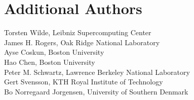 \section {Additional Authors}
Torsten Wilde, Leibniz Supercomputing Center\\
James H. Rogers, Oak Ridge National Laboratory\\
Ayse Coskun, Boston University\\
Hao Chen, Boston University\\
Peter M. Schwartz, Lawrence Berkeley National Laboratory\\
Gert Svensson, KTH Royal Institute of Technology\\
Bo Norregaard Jorgensen, University of Southern Denmark
